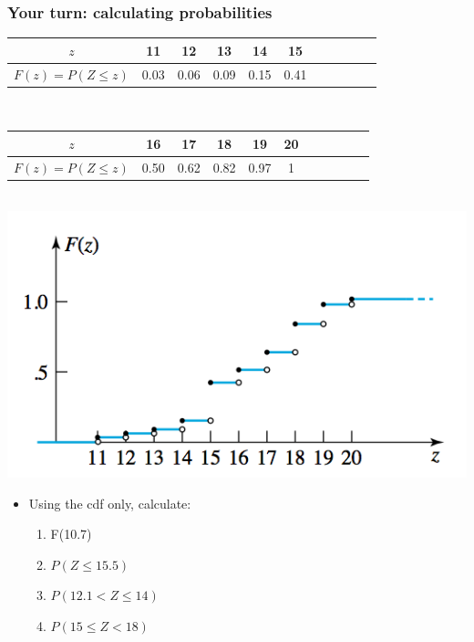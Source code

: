 \documentclass[handout]{beamer}\usepackage[]{graphicx}\usepackage[]{color}
\providecommand{\q}{$\quad$ \newline}
\numberwithin{equation}{section}
\begin{document}
\begin{frame}
\frametitle{Your turn: calculating probabilities} \scriptsize

\begin{center}
\begin{tabular}{ccccccccccc}
$z$ & 11 & 12 & 13 & 14 & 15 \\ \hline
$F(z) = P(Z \le z)$ & 0.03 & 0.06 & 0.09 & 0.15 & 0.41
\end{tabular} \q

\begin{tabular}{ccccccccccc}
$z$ & 16 & 17 & 18 & 19 & 20 \\ \hline
$F(z) = P(Z \le z)$ &  0.50 & 0.62 & 0.82 & 0.97 & 1 
\end{tabular} \q 
{} \includegraphics{../../fig/torquez.png}
\end{center}

\begin{itemize}
\item Using the cdf only, calculate:
\begin{enumerate}[1. ]
\item F(10.7)
\item $P(Z \le 15.5)$
\item $P( 12.1 < Z \le 14)$
\item $P( 15 \le Z <  18)$
\end{enumerate}
\end{itemize}
\end{frame}
\end{document}
